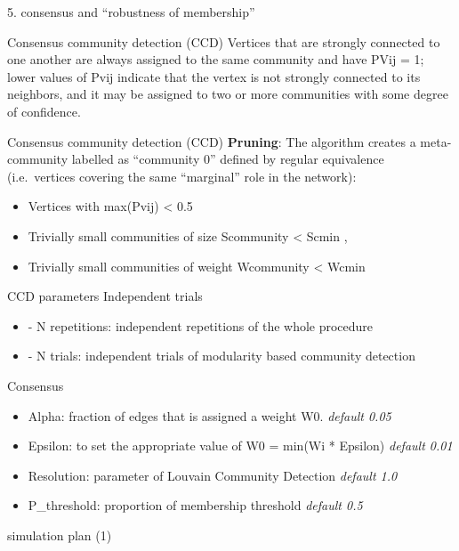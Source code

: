 \documentclass[
  ignorenonframetext,
]{beamer}
\providecommand{\tightlist}{%
  \setlength{\itemsep}{0pt}\setlength{\parskip}{0pt}}
\begin{document}
\begin{frame}[fragile]{5. consensus and ``robustness of membership''}
\begin{block}{Consensus community detection (CCD)}
Vertices that are strongly connected to one another are always assigned
to the same community and have PVij = 1; lower values of Pvij indicate
that the vertex is not strongly connected to its neighbors, and it may
be assigned to two or more communities with some degree of confidence.
\end{block}

\begin{block}{Consensus community detection (CCD)}
\protect\hypertarget{consensus-community-detection-ccd-3}{}
\textbf{Pruning}: The algorithm creates a meta-community labelled as
``community 0'' defined by regular equivalence (i.e.~vertices covering
the same ``marginal'' role in the network):

\begin{itemize}
\tightlist
\item
  Vertices with max(Pvij) \textless{} 0.5
\item
  Trivially small communities of size Scommunity \textless{} Scmin ,
\item
  Trivially small communities of weight Wcommunity \textless{} Wcmin
\end{itemize}
\end{block}

\begin{block}{CCD parameters}
\protect\hypertarget{ccd-parameters}{}
Independent trials

\begin{itemize}
\item
  - N repetitions: independent repetitions of the whole procedure
\item
  - N trials: independent trials of modularity based community detection
\end{itemize}

Consensus

\begin{itemize}
\item
  Alpha: fraction of edges that is assigned a weight W0. \emph{default
  0.05}
\item
  Epsilon: to set the appropriate value of W0 = min(Wi * Epsilon)
  \emph{default 0.01}
\item
  Resolution: parameter of Louvain Community Detection \emph{default
  1.0}
\item
  P\_threshold: proportion of membership threshold \emph{default 0.5}
\end{itemize}
\end{block}

\begin{block}{simulation plan (1)}
\protect\hypertarget{simulation-plan-1}{}
\end{block}


\end{frame}
\end{document}
